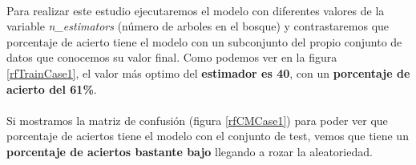 \paragraph{}
Para realizar este estudio ejecutaremos el modelo con diferentes valores de la variable \textit{n\_estimators}\cite{ref:rf_random_forest_classifier} (número de arboles en el bosque) y contrastaremos que porcentaje de acierto tiene el modelo con un subconjunto del propio conjunto de datos que conocemos su valor final. Como podemos ver en la figura \ref{rfTrainCase1}, el valor más optimo del \textbf{estimador es 40}, con un \textbf{porcentaje de acierto del 61\%}.

\paragraph{}
Si mostramos la matriz de confusión\cite{ref:confusion_matrix} (figura \ref{rfCMCase1}) para poder ver que porcentaje de aciertos tiene el modelo con el conjunto de test, vemos que tiene un \textbf{porcentaje de aciertos bastante bajo} llegando a rozar la aleatoriedad.

